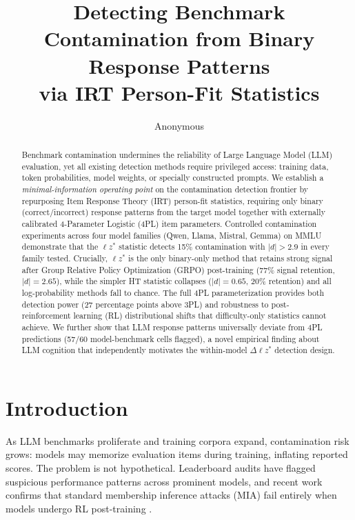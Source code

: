 \documentclass[11pt,a4paper]{article}
\title{Detecting Benchmark Contamination from Binary Response Patterns\\via IRT Person-Fit Statistics}
\author{Anonymous}
\date{}
\newcommand{\lzstar}{$\ell z^*$}
\begin{document}
\maketitle

\begin{abstract}
Benchmark contamination undermines the reliability of Large Language Model (LLM) evaluation, yet all existing detection methods require privileged access: training data, token probabilities, model weights, or specially constructed prompts.
We establish a \emph{minimal-information operating point} on the contamination detection frontier by repurposing Item Response Theory (IRT) person-fit statistics, requiring only binary (correct/incorrect) response patterns from the target model together with externally calibrated 4-Parameter Logistic (4PL) item parameters.
Controlled contamination experiments across four model families (Qwen, Llama, Mistral, Gemma) on MMLU demonstrate that the \lzstar{} statistic detects 15\% contamination with $|d|>2.9$ in every family tested.
Crucially, \lzstar{} is the only binary-only method that retains strong signal after Group Relative Policy Optimization (GRPO) post-training (77\% signal retention, $|d|=2.65$), while the simpler HT statistic collapses ($|d|=0.65$, 20\% retention) and all log-probability methods fall to chance.
The full 4PL parameterization provides both detection power (27 percentage points above 3PL) and robustness to post-reinforcement learning (RL) distributional shifts that difficulty-only statistics cannot achieve.
We further show that LLM response patterns universally deviate from 4PL predictions (57/60 model-benchmark cells flagged), a novel empirical finding about LLM cognition that independently motivates the within-model $\Delta\ell z^*$ detection design.
\end{abstract}

\section{Introduction}

As LLM benchmarks proliferate and training corpora expand, contamination risk grows: models may memorize evaluation items during training, inflating reported scores. The problem is not hypothetical. Leaderboard audits have flagged suspicious performance patterns across prominent models, and recent work confirms that standard membership inference attacks (MIA) fail entirely when models undergo RL post-training \citep{wang2025postrl}.
\end{document}
